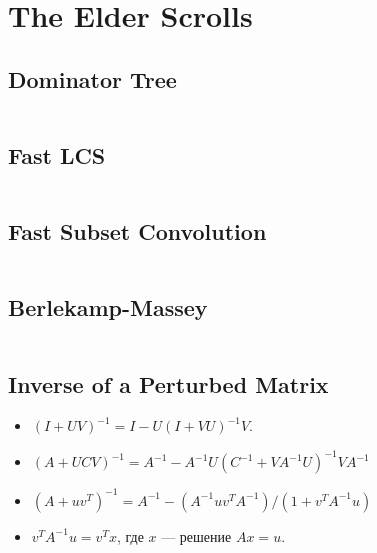 \section{The Elder Scrolls}

\subsection{Dominator Tree}

\inputminted{cpp}{\code/dominator_tree.cpp}

\subsection{Fast LCS}

\inputminted{cpp}{\code/fast_lcs_short.cpp}

\subsection{Fast Subset Convolution}

\inputminted{cpp}{\code/fast_subset_convolution.cpp}

\subsection{Berlekamp-Massey}

\inputminted{cpp}{\code/berlekamp.cpp}

\subsection{Inverse of a Perturbed Matrix}

\begin{itemize} 
\item $(I + UV)^{-1} = I - U(I + VU)^{-1} V$.
\item $(A + UCV)^{-1} = A^{-1} - A^{-1} U (C^{-1} + VA^{-1} U)^{-1} VA^{-1}$
\item $(A + uv^T)^{-1} = A^{-1} - (A^{-1} uv^T A^{-1})/(1 + v^T A^{-1} u)$
\item $v^T A^{-1} u = v^T x$, где $x$ --- решение $Ax = u$.
\end{itemize}
